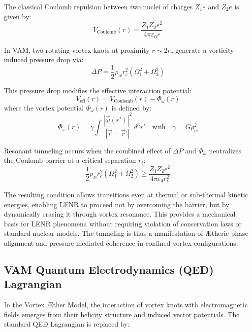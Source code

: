 The classical Coulomb repulsion between two nuclei of charges \( Z_1 e \) and \( Z_2 e \) is given by:
\begin{equation}
    V_{\text{Coulomb}}(r) = \frac{Z_1 Z_2 e^2}{4\pi \varepsilon_0 r}
\end{equation}

In VAM, two rotating vortex knots at proximity \( r \sim 2r_c \) generate a vorticity-induced pressure drop via:
\begin{equation}
    \Delta P = \frac{1}{2} \rho_{\text{\ae}} r_c^2 (\Omega_1^2 + \Omega_2^2)
\end{equation}

This pressure drop modifies the effective interaction potential:
\begin{equation}
    V_{\text{eff}}(r) = V_{\text{Coulomb}}(r) - \Phi_\omega(r)
\end{equation}
where the vortex potential \( \Phi_\omega(r) \) is defined by:
\begin{equation}
    \Phi_\omega(r) = \gamma \int \frac{|\vec{\omega}(r')|^2}{|\vec{r} - \vec{r}'|} \, d^3r'
    \quad \text{with} \quad
    \gamma = G \rho_{\text{\ae}}^2
\end{equation}

Resonant tunneling occurs when the combined effect of \( \Delta P \) and \( \Phi_\omega \) neutralizes the Coulomb barrier at a critical separation \( r_t \):
\begin{equation}
    \frac{1}{2} \rho_{\text{\ae}} r_c^2 (\Omega_1^2 + \Omega_2^2) \geq \frac{Z_1 Z_2 e^2}{4\pi \varepsilon_0 r_t^2}
\end{equation}

The resulting condition allows transitions even at thermal or sub-thermal kinetic energies, enabling LENR to proceed not by overcoming the barrier, but by dynamically erasing it through vortex resonance. This provides a mechanical basis for LENR phenomena without requiring violation of conservation laws or standard nuclear models. The tunneling is thus a manifestation of Ætheric phase alignment and pressure-mediated coherence in confined vortex configurations.


\subsection*{VAM Quantum Electrodynamics (QED) Lagrangian}

In the Vortex \AE ther Model, the interaction of vortex knots with electromagnetic fields emerges from their helicity structure and induced vector potentials. The standard QED Lagrangian is replaced by:

